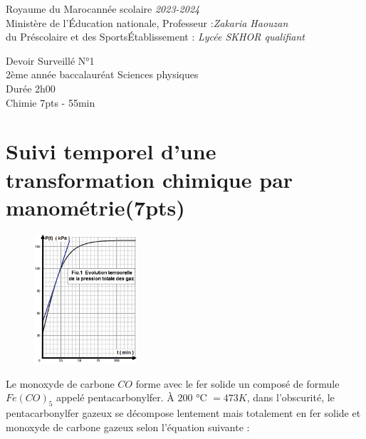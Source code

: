 \documentclass[12pt]{article}
\newcommand\headerMe[2]{\noindent{}#1\hfill#2}
\begin{document}
\headerMe{Royaume du Maroc}{année scolaire \emph{2023-2024}}\\
\headerMe{Ministère de l'Éducation nationale, }{  Professeur :\emph{Zakaria Haouzan}}\\
\headerMe{du Préscolaire et des Sports}{Établissement : \emph{Lycée SKHOR qualifiant}}\\
\vspace{-1cm}
\begin{center}
Devoir Surveillé  N°1 \\
    2ème année baccalauréat Sciences physiques\\
Durée 2h00
\\
    \vspace{.2cm}
\hrulefill
\Large{Chimie 7pts - 55min}
\hrulefill\\

\end{center}

 \section*{Suivi temporel d’une transformation chimique par manométrie\dotfill(7pts) }
 \begin{figure}

	\vspace{-1.2cm}
\begin{center}
  \includegraphics[width=0.340\textwidth]{./img/fig00.png}
\end{center}
\end{figure}

Le monoxyde de carbone $CO$ forme avec le fer solide un composé de formule $Fe(CO)_5$ appelé pentacarbonylfer.
À $200$ °C $= 473 K$, dans l'obscurité, le pentacarbonylfer gazeux se décompose lentement mais totalement en fer solide
et monoxyde de carbone gazeux selon l’équation suivante :
\end{document}
